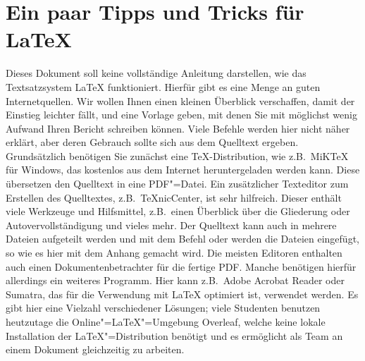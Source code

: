 \newpage
\appendix
\section{Ein paar Tipps und Tricks für \LaTeX}
\label{sec:Latex}
%
Dieses Dokument soll keine vollständige Anleitung darstellen, wie das Textsatzsystem \LaTeX{}  funktioniert. Hierfür gibt es eine Menge an guten Internetquellen. Wir wollen Ihnen einen kleinen Überblick verschaffen, damit der Einstieg leichter fällt, und eine Vorlage geben, mit denen Sie mit möglichst wenig Aufwand Ihren Bericht schreiben können. Viele Befehle werden hier nicht näher erklärt, aber deren Gebrauch sollte sich aus dem Quelltext ergeben. Grundsätzlich benötigen Sie zunächst eine TeX-Distribution, wie z.B.\ MiKTeX für Windows, das kostenlos aus dem Internet heruntergeladen werden kann. Diese übersetzen den Quelltext in eine PDF"=Datei. Ein zusätzlicher Texteditor zum Erstellen des Quelltextes, z.B.\ TeXnicCenter, ist sehr hilfreich. Dieser enthält viele Werkzeuge und Hilfsmittel, z.B.\ einen Überblick über die Gliederung oder Autovervollständigung und vieles mehr. Der Quelltext kann auch in mehrere Dateien aufgeteilt werden und mit dem Befehl \verb++ oder \verb"" werden die Dateien eingefügt, so wie es hier mit dem Anhang gemacht wird. Die meisten Editoren enthalten auch einen Dokumentenbetrachter für die fertige PDF. Manche benötigen hierfür allerdings ein weiteres Programm. Hier kann z.B.\ Adobe Acrobat Reader oder Sumatra, das für die Verwendung mit \LaTeX{} optimiert ist, verwendet werden. Es gibt hier eine Vielzahl verschiedener Lösungen; viele Studenten benutzen heutzutage die Online"=\LaTeX"=Umgebung Overleaf, welche keine lokale Installation der \LaTeX"=Distribution benötigt und es ermöglicht als Team an einem Dokument gleichzeitig zu arbeiten.
%
